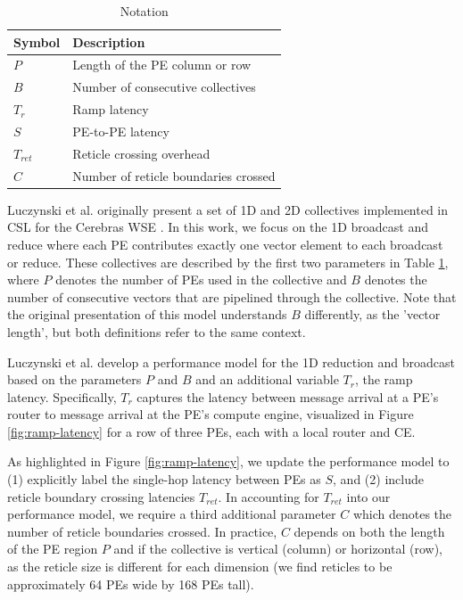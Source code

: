 \documentclass[conference]{IEEEtran}
\begin{document}
\begin{table}[t]
    \caption{Notation}
    \centering
    \begin{tabular}{ll}
        \hline
        Symbol    & Description                          \\
        \hline
        $P$       & Length of the PE column or row       \\
        $B$       & Number of consecutive collectives    \\
        \hline
        $T_r$     & Ramp latency                         \\
        $S$       & PE-to-PE latency                     \\
        $T_{ret}$ & Reticle crossing overhead            \\
        $C$       & Number of reticle boundaries crossed \\
        \hline
    \end{tabular}
    \label{tab:notation}
\end{table}

Luczynski et al. originally present a set of 1D and 2D collectives implemented in CSL for the Cerebras WSE \cite{Luczynski_2024}. In this work, we focus on the 1D broadcast and reduce where each PE contributes exactly one vector element to each broadcast or reduce. These collectives are described by the first two parameters in Table \ref{tab:notation}, where $P$ denotes the number of PEs used in the collective and $B$ denotes the number of consecutive vectors that are pipelined through the collective. Note that the original presentation of this model understands $B$ differently, as the 'vector length', but both definitions refer to the same context.


Luczynski et al. develop a performance model for the 1D reduction and broadcast based on the parameters $P$ and $B$ and an additional variable $T_r$, the ramp latency. Specifically, $T_r$ captures the latency between message arrival at a PE's router to message arrival at the PE's compute engine, visualized in Figure \ref{fig:ramp-latency} for a row of three PEs, each with a local router and CE.

As highlighted in Figure \ref{fig:ramp-latency}, we update the performance model to (1) explicitly label the single-hop latency between PEs as $S$, and (2) include reticle boundary crossing latencies $T_{ret}$.
In accounting for $T_{ret}$ into our performance model, we require a third additional parameter $C$ which denotes the number of reticle boundaries crossed. In practice, $C$ depends on both the length of the PE region $P$ and if the collective is vertical (column) or horizontal (row), as the reticle size is different for each dimension (we find reticles to be approximately 64 PEs wide by 168 PEs tall).
\end{document}
